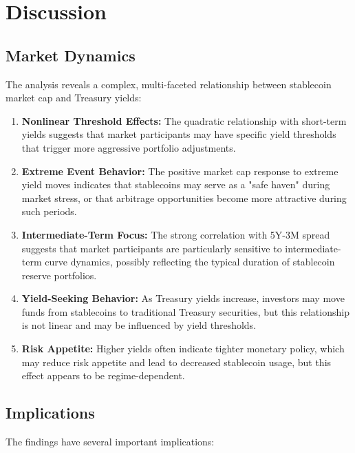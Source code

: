 \documentclass[12pt,a4paper]{article}
\begin{document}
\section{Discussion}

\subsection{Market Dynamics}
The analysis reveals a complex, multi-faceted relationship between stablecoin market cap and Treasury yields:

\begin{enumerate}
    \item \textbf{Nonlinear Threshold Effects:} The quadratic relationship with short-term yields suggests that market participants may have specific yield thresholds that trigger more aggressive portfolio adjustments.
    
    \item \textbf{Extreme Event Behavior:} The positive market cap response to extreme yield moves indicates that stablecoins may serve as a "safe haven" during market stress, or that arbitrage opportunities become more attractive during such periods.
    
    \item \textbf{Intermediate-Term Focus:} The strong correlation with 5Y-3M spread suggests that market participants are particularly sensitive to intermediate-term curve dynamics, possibly reflecting the typical duration of stablecoin reserve portfolios.
    
    \item \textbf{Yield-Seeking Behavior:} As Treasury yields increase, investors may move funds from stablecoins to traditional Treasury securities, but this relationship is not linear and may be influenced by yield thresholds.
    
    \item \textbf{Risk Appetite:} Higher yields often indicate tighter monetary policy, which may reduce risk appetite and lead to decreased stablecoin usage, but this effect appears to be regime-dependent.
\end{enumerate}

\subsection{Implications}
The findings have several important implications:
\end{document}

